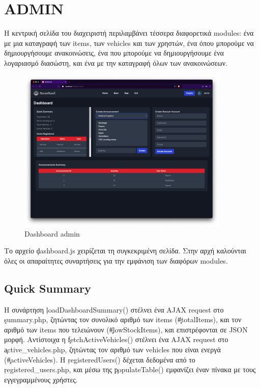 \section{ADMIN}
    Η κεντρική σελίδα του διαχειριστή περιλαμβάνει τέσσερα διαφορετικά modules: ένα με μια καταγραφή των items, των vehicles και των χρηστών,
        ένα όπου μπορούμε να δημιουργήσουμε ανακοινώσεις, ένα που μπορούμε να δημιουργήσουμε ένα λογαριασμό διασώστη, και ένα με την καταγραφή όλων των ανακοινώσεων.

    \vspace{-1em}
    \begin{figure}[H] \noindent \centering
        \includegraphics[width=0.9\textwidth]{img/admin-dashboard}
        \vspace{-1em}
        \caption{Dashboard admin}
    \end{figure}

    Το αρχείο \c{dashboard.js} χειρίζεται τη συγκεκριμένη σελίδα.
    Στην αρχή καλούνται όλες οι απαραίτητες συναρτήσεις για την εμφάνιση των διαφόρων modules.

    \subsection{Quick Summary}
        Η συνάρτηση \c{loadDashboardSummary()} στέλνει ένα AJAX request στο \c{summary.php}, ζητώντας τον συνολικό αριθμό των items (\c{#totalItems}),
            και τον αριθμό των items που τελειώνουν (\c{#lowStockItems}), και επιστρέφονται σε JSON μορφή.
        Αντίστοιχα η \c{fetchActiveVehicles()} στέλνει ένα AJAX request στο \c{active\_vehicles.php}, ζητώντας τον αριθμό των vehicles που είναι ενεργά (\c{#activeVehicles}).
        Η \c{registeredUsers()} δέχεται δεδομένα από το \c{registered\_users.php}, και μέσω της \c{populateTable()} εμφανίζει έναν πίνακα με τους εγγεγραμμένους χρήστες.

